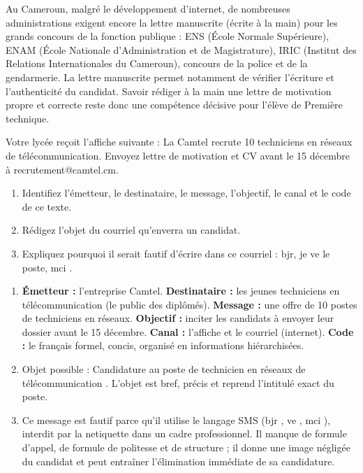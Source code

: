 \documentclass[11pt]{article}
\newcommand{\cle}[1]{{\popxbold\color{popdark}#1}}
\newcounter{popsec}
\newcounter{popsub}
\newcommand{\courssub}[1]{%
  \stepcounter{popsub}%
  \par\vspace{9pt}\noindent{\popxbold\fontsize{11.5}{13}\selectfont\color{popink}{\color{poporange}\thepopsec.\thepopsub}\hspace{6pt}#1}\par\nopagebreak\vspace{4pt}
}
\begin{document}
\begin{savaistu}
Au Cameroun, malgré le développement d'internet, de nombreuses administrations exigent encore la \cle{lettre manuscrite} (écrite à la main) pour les grands concours de la fonction publique : ENS (École Normale Supérieure), ENAM (École Nationale d'Administration et de Magistrature), IRIC (Institut des Relations Internationales du Cameroun), concours de la police et de la gendarmerie. La lettre manuscrite permet notamment de vérifier l'écriture et l'authenticité du candidat. Savoir rédiger à la main une lettre de motivation propre et correcte reste donc une compétence décisive pour l'élève de Première technique.
\end{savaistu}

\courssub{Exercice d'application}

\begin{exercice}
Votre lycée reçoit l'affiche suivante : \og La Camtel recrute 10 techniciens en réseaux de télécommunication. Envoyez lettre de motivation et CV avant le 15 décembre à recrutement@camtel.cm. \fg{}
\begin{enumerate}
\item Identifiez l'émetteur, le destinataire, le message, l'objectif, le canal et le code de ce texte.
\item Rédigez l'objet du courriel qu'enverra un candidat.
\item Expliquez pourquoi il serait fautif d'écrire dans ce courriel : \og bjr, je ve le poste, mci \fg{}.
\end{enumerate}
\end{exercice}

\begin{corrige}
\begin{enumerate}
\item \textbf{Émetteur :} l'entreprise Camtel. \textbf{Destinataire :} les jeunes techniciens en télécommunication (le public des diplômés). \textbf{Message :} une offre de 10 postes de techniciens en réseaux. \textbf{Objectif :} inciter les candidats à envoyer leur dossier avant le 15 décembre. \textbf{Canal :} l'affiche et le courriel (internet). \textbf{Code :} le français formel, concis, organisé en informations hiérarchisées.
\item Objet possible : \og Candidature au poste de technicien en réseaux de télécommunication \fg{}. L'objet est bref, précis et reprend l'intitulé exact du poste.
\item Ce message est fautif parce qu'il utilise le langage SMS (\og bjr \fg{}, \og ve \fg{}, \og mci \fg{}), interdit par la netiquette dans un cadre professionnel. Il manque de formule d'appel, de formule de politesse et de structure ; il donne une image négligée du candidat et peut entraîner l'élimination immédiate de sa candidature.
\end{enumerate}
\end{corrige}
\end{document}
